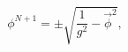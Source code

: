 \begin{equation}
\phi^{N+1}=\pm \sqrt{\frac{1}{g^2}-{\vec{\phi}}^2},
\label{phi_N+1}
\end{equation}

